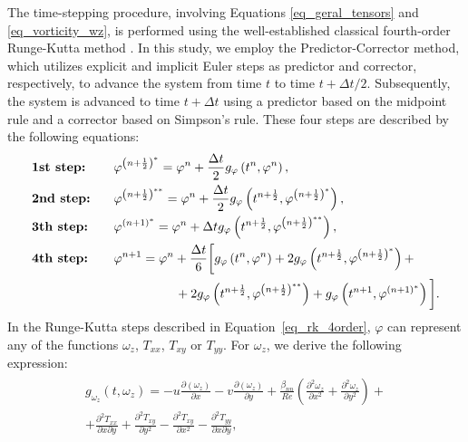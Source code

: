 \documentclass[preprint, 12pt]{elsarticle}
\begin{document}
The time-stepping procedure, involving Equations \eqref{eq_geral_tensors} and \eqref{eq_vorticity_wz}, is performed using the well-established classical fourth-order Runge-Kutta method \cite{ferziger2002computational}. In this study, we employ the Predictor-Corrector method, which utilizes explicit and implicit Euler steps as predictor and corrector, respectively, to advance the system from time $t$ to time $t+\Delta t / 2$. Subsequently, the system is advanced to time $t+\Delta t$ using a predictor based on the midpoint rule and a corrector based on Simpson's rule. These four steps are described by the following equations:
\begin{gather}
    \begin{aligned}
        &\textbf{1st step:} & & \hspace{0.3cm}\varphi^{\left(n+\frac{1}{2}\right)^{*}} =\varphi^n+\frac{\Delta t}{2} g_{\varphi}\left(t^n, \varphi^n\right),\\
        &\textbf{2nd step:} & & \hspace{0.3cm}\varphi^{\left(n+\frac{1}{2}\right)^{* *}} =\varphi^n+\frac{\Delta t}{2} g_{\varphi}\left(t^{n+\frac{1}{2}}, \varphi^{\left(n+\frac{1}{2}\right)^*}\right),\\
        &\textbf{3th step:} & & \hspace{0.3cm}\varphi^{(n+1)^*} =\varphi^n+\Delta t g_{\varphi}\left(t^{n+\frac{1}{2}},\varphi^{\left(n+\frac{1}{2}\right)^{* *}}\right),\\
        &\textbf{4th step:} & & \hspace{0.3cm}\varphi^{n+1} = \varphi^n+\frac{\Delta t}{6}\bigg[g_{\varphi}\left(t^n, \varphi^n\right) + 2 g_{\varphi}\left(t^{n+\frac{1}{2}}, \varphi^{\left(n+\frac{1}{2}\right)^{*}}\right) + \\ 
        & & &\hspace{2cm} + 2 g_{\varphi}\left(t^{n+\frac{1}{2}}, \varphi^{\left(n+\frac{1}{2}\right)^{**}}\right)+ g_{\varphi}\left(t^{n+1}, \varphi^{(n+1)^{*}}\right)\bigg].\label{eq_rk_4order}
    \end{aligned}
\end{gather}
In the Runge-Kutta steps described in Equation~\eqref{eq_rk_4order}, $\varphi$ can represent any of the functions $\omega_{z}$, $T_{xx}$, $T_{xy}$ or $T_{yy}$. For $\omega_{z}$, we derive the following expression:
\begin{gather}
    \begin{aligned}
        g_{\omega_{z}}\left(t, \omega_z\right) = - u\frac{\partial\left(\omega_{z}\right)}{\partial x} - v \frac{\partial\left(\omega_{z}\right)}{\partial y} + \frac{\beta_{nn}}{R e}\left(\frac{\partial^2 \omega_{z}}{\partial x^2} + \frac{\partial^2 \omega_{z}}{\partial y^2}\right) + \\ +  \frac{\partial^2 T_{x x}}{\partial x \partial y} + \frac{\partial^2 T_{x y}}{\partial y^2} - \frac{\partial^2 T_{x y}}{\partial x^2} - \frac{\partial^2 T_{y y}}{\partial x \partial y},
    \end{aligned}
\end{gather}
\end{document}
